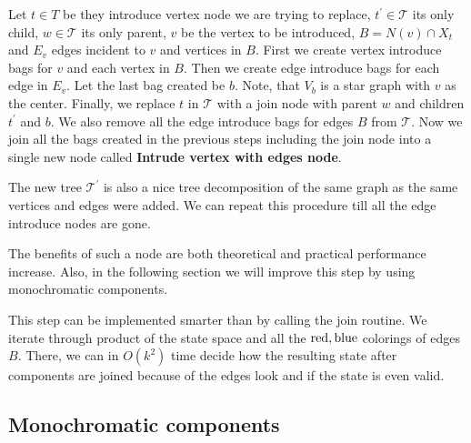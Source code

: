 Let \( t \in T \) be they introduce vertex node we are trying to replace,
\( t^\prime \in \mathcal{T} \) its only child,
\( w \in \mathcal{T} \) its only parent,
\( v \) be the vertex to be introduced,
\( B = N(v) \cap X_t \) and
\( E_v \) edges incident to \( v \) and vertices in \( B \).
First we create vertex introduce bags for \( v \) and each vertex in \( B \).
Then we create edge introduce bags for each edge in \( E_v \).
Let the last bag created be \( b \).
Note, that \( V_b \) is a star graph with \( v \) as the center.
Finally, we replace \( t \) in \( \mathcal{T} \) with a join node
with parent \( w \) and children \( t^\prime \) and \( b \).
We also remove all the edge introduce bags for edges \( B \) from \( \mathcal{T} \).
Now we join all the bags created in the previous steps including the join node
into a single new node called \textbf{Intrude vertex with edges node}.

The new tree \( \mathcal{T}^\prime \) is also a nice tree decomposition
of the same graph as the same vertices and edges were added.
We can repeat this procedure till all the edge introduce nodes are gone.

The benefits of such a node are both theoretical and practical performance increase.
Also, in the following section we will improve this step by using monochromatic components.

This step can be implemented smarter than by calling the join routine.
We iterate through product of the state space and all the \( \text{red}, \text{blue} \)
colorings of edges \( B \). There, we can in \( O(k^2) \) time decide
how the resulting state after components are joined because of the edges look and
if the state is even valid.

\subsection{Monochromatic components}



